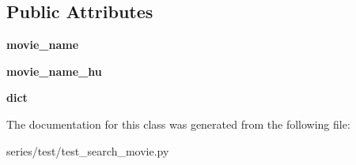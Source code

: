 \subsection*{Public Attributes}
\begin{DoxyCompactItemize}
\item 
\mbox{\label{classseries_1_1test_1_1test__search__movie_1_1_search_movie_test_af9409e5c5e4cc567243264763c2383da}} 
{\bfseries movie\+\_\+name}
\item 
\mbox{\label{classseries_1_1test_1_1test__search__movie_1_1_search_movie_test_ab53bb1cbbbbc080fc26254de956e31fc}} 
{\bfseries movie\+\_\+name\+\_\+hu}
\item 
\mbox{\label{classseries_1_1test_1_1test__search__movie_1_1_search_movie_test_ad58d7c6df846920c0fd5f653a0fcc074}} 
{\bfseries dict}
\end{DoxyCompactItemize}


The documentation for this class was generated from the following file\+:\begin{DoxyCompactItemize}
\item 
series/test/test\+\_\+search\+\_\+movie.\+py\end{DoxyCompactItemize}
